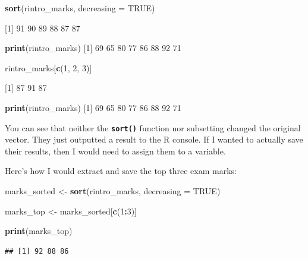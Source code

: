 \documentclass[
]{book}
\newenvironment{Shaded}{\begin{snugshade}}{\end{snugshade}}
\newcommand{\AttributeTok}[1]{\textcolor[rgb]{0.13,0.29,0.53}{#1}}
\newcommand{\ConstantTok}[1]{\textcolor[rgb]{0.56,0.35,0.01}{#1}}
\newcommand{\DecValTok}[1]{\textcolor[rgb]{0.00,0.00,0.81}{#1}}
\newcommand{\FunctionTok}[1]{\textcolor[rgb]{0.13,0.29,0.53}{\textbf{#1}}}
\newcommand{\NormalTok}[1]{#1}
\newcommand{\OtherTok}[1]{\textcolor[rgb]{0.56,0.35,0.01}{#1}}
\newcommand{\SpecialCharTok}[1]{\textcolor[rgb]{0.81,0.36,0.00}{\textbf{#1}}}
\begin{document}
\begin{Shaded}
\begin{Highlighting}[]
\FunctionTok{sort}\NormalTok{(rintro\_marks, }\AttributeTok{decreasing =} \ConstantTok{TRUE}\NormalTok{)}

\NormalTok{[}\DecValTok{1}\NormalTok{] }\DecValTok{91} \DecValTok{90} \DecValTok{89} \DecValTok{88} \DecValTok{87} \DecValTok{87}

\FunctionTok{print}\NormalTok{(rintro\_marks)}
\NormalTok{[}\DecValTok{1}\NormalTok{] }\DecValTok{69} \DecValTok{65} \DecValTok{80} \DecValTok{77} \DecValTok{86} \DecValTok{88} \DecValTok{92} \DecValTok{71}

\NormalTok{rintro\_marks[}\FunctionTok{c}\NormalTok{(}\DecValTok{1}\NormalTok{, }\DecValTok{2}\NormalTok{, }\DecValTok{3}\NormalTok{)]}

\NormalTok{[}\DecValTok{1}\NormalTok{] }\DecValTok{87} \DecValTok{91} \DecValTok{87}

\FunctionTok{print}\NormalTok{(rintro\_marks)}
\NormalTok{[}\DecValTok{1}\NormalTok{] }\DecValTok{69} \DecValTok{65} \DecValTok{80} \DecValTok{77} \DecValTok{86} \DecValTok{88} \DecValTok{92} \DecValTok{71}
\end{Highlighting}
\end{Shaded}

You can see that neither the \textbf{\texttt{sort()}} function nor subsetting changed the original vector. They just outputted a result to the R console. If I wanted to actually save their results, then I would need to assign them to a variable.

Here's how I would extract and save the top three exam marks:

\begin{Shaded}
\begin{Highlighting}[]
\NormalTok{marks\_sorted }\OtherTok{\textless{}{-}} \FunctionTok{sort}\NormalTok{(rintro\_marks, }\AttributeTok{decreasing =} \ConstantTok{TRUE}\NormalTok{)}

\NormalTok{marks\_top }\OtherTok{\textless{}{-}}\NormalTok{ marks\_sorted[}\FunctionTok{c}\NormalTok{(}\DecValTok{1}\SpecialCharTok{:}\DecValTok{3}\NormalTok{)]}

\FunctionTok{print}\NormalTok{(marks\_top)}
\end{Highlighting}
\end{Shaded}

\begin{verbatim}
## [1] 92 88 86
\end{verbatim}
\end{document}
